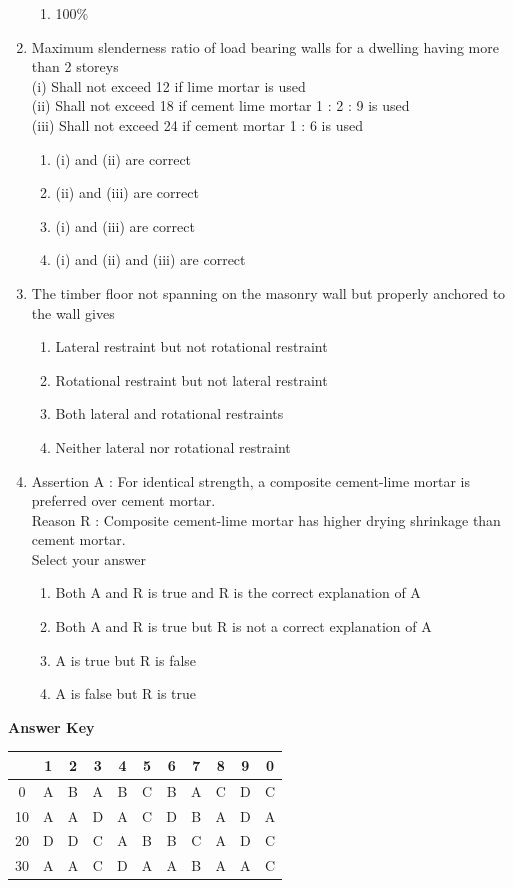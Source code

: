 \documentclass[11pt,a4paper]{article}
\begin{document}
\begin{enumerate}
\begin{enumerate}[label=\Alph*.]
\item{100\%}
\end{enumerate}
\item{Maximum slenderness ratio of load bearing walls for a dwelling having more than 2 storeys \\
(i) Shall not exceed 12 if lime mortar is used \\
(ii) Shall not exceed 18 if cement lime mortar 1 : 2 : 9 is used \\
(iii) Shall not exceed 24 if cement mortar 1 : 6 is used}
\begin{enumerate}[label=\Alph*.]
\item{(i) and (ii) are correct}
\item{(ii) and (iii) are correct}
\item{(i) and (iii) are correct}
\item{(i) and (ii) and (iii) are correct}
\end{enumerate}
\item{The timber floor not spanning on the masonry wall but properly anchored to the wall gives}
\begin{enumerate}[label=\Alph*.]
\item{Lateral restraint but not rotational restraint}
\item{Rotational restraint but not lateral restraint}
\item{Both lateral and rotational restraints}
\item{Neither lateral nor rotational restraint}
\end{enumerate}
\item{Assertion A : For identical strength, a composite cement-lime mortar is preferred over cement mortar. \\
Reason R : Composite cement-lime mortar has higher drying shrinkage than cement mortar. \\
Select your answer}
\begin{enumerate}[label=\Alph*.]
\item{Both A and R is true and R is the correct explanation of A}
\item{Both A and R is true but R is not a correct explanation of A}
\item{A is true but R is false}
\item{A is false but R is true}
\end{enumerate}
\end{enumerate}
\textbf{Answer Key}
\begin{tabular}{ | c | c c c c c c c c c c | }
\hline
 & 1 & 2 & 3 & 4 & 5 & 6 & 7 & 8 & 9 & 0 \\
\hline
0 & A & B & A & B & C & B & A & C & D & C \\
10 & A & A & D & A & C & D & B & A & D & A \\
20 & D & D & C & A & B & B & C & A & D & C \\
30 & A & A & C & D & A & A & B & A & A & C \\
\hline
\end{tabular}
\clearpage
\end{document}
